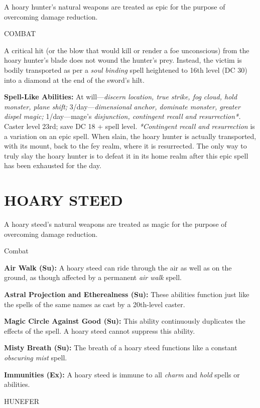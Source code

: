 \documentclass{article}
\begin{document}
{A hoary hunter's natural weapons are treated as epic for the purpose of overcoming 
damage reduction.

COMBAT 

A critical hit (or the blow that would kill or render a foe unconscious) from the 
hoary hunter's blade does not wound the hunter's prey. Instead, the victim is bodily 
transported as per a \textit{soul binding }spell heightened to 16th level (DC 30) 
into a diamond at the end of the sword's hilt. 

\textbf{Spell-Like Abilities: }At will---\textit{discern location, true strike, 
fog cloud, hold monster, plane shift; }3/day---\textit{dimensional anchor, dominate 
monster, greater dispel magic; }1/day---mage's \textit{disjunction, contingent 
recall and resurrection*. }Caster level 23rd; save DC 18 + spell level. \textit{*Contingent 
recall and resurrection }is a variation on an epic spell. When slain, the hoary 
hunter is actually transported, with its mount, back to the fey realm, where it 
is resurrected. The only way to truly slay the hoary hunter is to defeat it in 
its home realm after this epic spell has been exhausted for the day. 

\vspace{12pt}
\section*{HOARY STEED }

A hoary steed's natural weapons are treated as magic for the purpose of overcoming 
damage reduction.

Combat 

\textbf{Air Walk (Su):} A hoary steed can ride through the air as well as on the 
ground, as though affected by a permanent \textit{air walk }spell. 

\textbf{Astral Projection and Etherealness (Su):} These abilities function just 
like the spells of the same names as cast by a 20th-level caster. 

\textbf{Magic Circle Against Good (Su):} This ability continuously duplicates the 
effects of the spell. A hoary steed cannot suppress this ability. 

\textbf{Misty Breath (Su):} The breath of a hoary steed functions like a constant 
\textit{obscuring mist }spell. 

\textbf{Immunities (Ex):} A hoary steed is immune to all \textit{charm }and \textit{hold 
}spells or abilities. 

\vspace{12pt}
{\LARGE{}HUNEFER }

}
\end{document}
